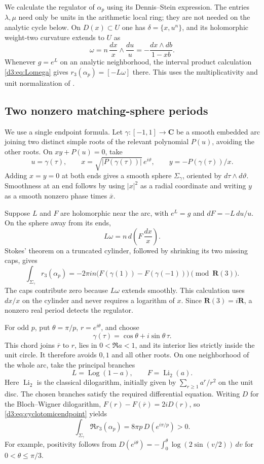 \documentclass[11pt,a4paper]{amsart}
\numberwithin{equation}{section}
\theoremstyle{definition}
\theoremstyle{remark}
\newcommand{\R}{\mathbf R}
\newcommand{\C}{\mathbf C}
\begin{document}
We calculate the regulator of $\alpha_p$ using its Dennis--Stein expression.
The entries $\lambda,\mu$ need only be units in the arithmetic local ring;
they are not needed on the analytic cycle below.
On $D(x)\subset U$ one has $\delta=\{x,u^n\}$, and its holomorphic
weight-two curvature extends to $U$ as
\[
 \omega=n\,\frac{dx}{x}\wedge\frac{du}{u}
        =-\frac{dx\wedge db}{1-xb}.
\]
Whenever $g=e^L$ on an analytic neighborhood, the interval product
calculation \eqref{d3:eq:Lomega} gives
$r_3(\alpha_p)=[-L\omega]$ there.
This uses the multiplicativity and unit normalization of
\cite[Proposition~2.8, Theorem~2.31 and Lemma~4.5]{BunkeTamme}.

\subsection{Two nonzero matching-sphere periods}

We use a single endpoint formula. Let $\gamma:[-1,1]\to\C$ be a smooth
embedded arc joining two distinct simple roots of the relevant polynomial
$P(u)$, avoiding the other roots. On $xy+P(u)=0$, take
\[
 u=\gamma(\tau),\qquad
 x=\sqrt{|P(\gamma(\tau))|}\,e^{i\vartheta},\qquad
 y=-P(\gamma(\tau))/x.
\]
Adding $x=y=0$ at both ends gives a smooth sphere $\Sigma_\gamma$,
oriented by $d\tau\wedge d\vartheta$. Smoothness at an end follows by
using $|x|^2$ as a radial coordinate and writing $y$ as a smooth
nonzero phase times $\overline x$.

Suppose $L$ and $F$ are holomorphic near the arc, with
$e^L=g$ and $dF=-L\,du/u$. On the sphere away from its ends,
\[
 L\omega=n\,d\left(F\,\frac{dx}{x}\right).
\]
Stokes' theorem on a truncated cylinder, followed by shrinking its
two missing caps, gives
\begin{equation}\label{d3:eq:cyclotomicendpoint}
 \int_{\Sigma_\gamma}r_3(\alpha_p)
 =-2\pi i n\bigl(F(\gamma(1))-F(\gamma(-1))\bigr)
 \pmod{\R(3)}.
\end{equation}
The caps contribute zero because $L\omega$ extends smoothly.
This calculation uses $dx/x$ on the cylinder and never requires a
logarithm of $x$. Since $\R(3)=i\R$, a nonzero real period detects
the regulator.

For odd $p$, put $\theta=\pi/p$, $r=e^{i\theta}$, and choose
\[
 \gamma(\tau)=\cos\theta+i\sin\theta\,\tau .
\]
This chord joins $\overline r$ to $r$, lies in $0<\Re a<1$, and its
interior lies strictly inside the unit circle. It therefore avoids
$0,1$ and all other roots. On one neighborhood of the whole arc,
take the principal branches
\[
 L=\operatorname{Log}(1-a),\qquad F=\operatorname{Li}_2(a).
\]
Here $\operatorname{Li}_2$ is the classical dilogarithm, initially
given by $\sum_{r\geq1}a^r/r^2$ on the unit disc. The chosen
branches satisfy the required differential equation.
Writing $D$ for the Bloch--Wigner dilogarithm,
$F(r)-F(\overline r)=2iD(r)$, so \eqref{d3:eq:cyclotomicendpoint} yields
\begin{equation}\label{d3:eq:oddcyclotomicperiod}
 \int_{\Sigma_\gamma}\Re r_3(\alpha_p)
 =8\pi p\,D(e^{i\pi/p})>0.
\end{equation}
For example, positivity follows from
$D(e^{i\theta})=-\int_0^\theta\log(2\sin(v/2))\,dv$
for $0<\theta\leq\pi/3$.
\end{document}
